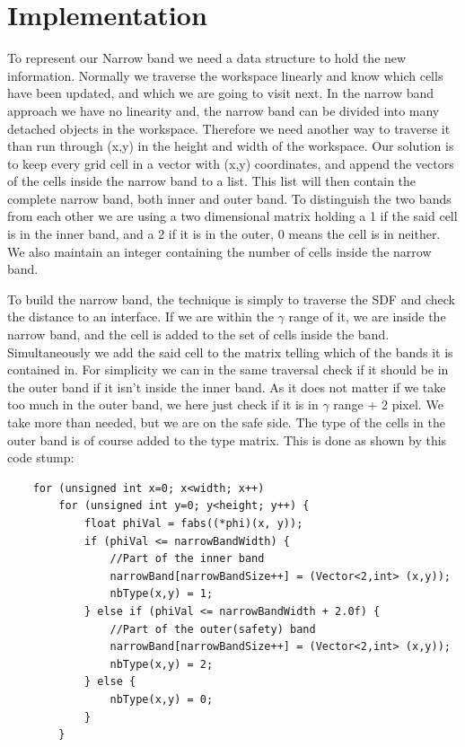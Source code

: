 \section{Implementation}
To represent our Narrow band we need a data structure to hold the new
information. Normally we traverse the workspace linearly and know
which cells have been updated, and which we are going to visit
next. In the narrow band approach we have no linearity and, the narrow
band can be divided into many detached objects in the
workspace. Therefore we need another way to traverse it than run
through (x,y) in the height and width of the workspace. Our solution is
to keep every grid cell in a vector with (x,y) coordinates, and append the
vectors of the cells inside the narrow band to a list. This list will
then contain the complete narrow band, both inner and outer band. To
distinguish the two bands from each other we are using a two dimensional matrix
holding a 1 if the said cell is in the inner band, and a 2 if it is
in the outer, 0 means the cell is in neither. We also maintain an
integer containing the number of cells inside the narrow band.

To build the narrow band, the technique is simply to traverse the SDF
and check the distance to an interface. If we are within the $\gamma$
range of it, we are inside the narrow band, and the cell is added to
the set of cells inside the band. Simultaneously  we add the said cell to
the matrix telling which of the bands it is contained in. For
simplicity we can in the same traversal check if it should be in the
outer band if it isn't inside the inner band. As it does not matter if
we take too much in the outer band, we here just check if it is in
$\gamma$ range + 2 pixel. We take more than needed, but we are on the
safe side. The type of the cells in the outer band is of course added
to the type matrix. This is done as shown by this code stump:
\begin{lstlisting}
    for (unsigned int x=0; x<width; x++)
        for (unsigned int y=0; y<height; y++) {
            float phiVal = fabs((*phi)(x, y));
            if (phiVal <= narrowBandWidth) {
                //Part of the inner band
                narrowBand[narrowBandSize++] = (Vector<2,int> (x,y));
                nbType(x,y) = 1;
            } else if (phiVal <= narrowBandWidth + 2.0f) {
                //Part of the outer(safety) band
                narrowBand[narrowBandSize++] = (Vector<2,int> (x,y));
                nbType(x,y) = 2;
            } else {
                nbType(x,y) = 0;
            }
        }
\end{lstlisting}


